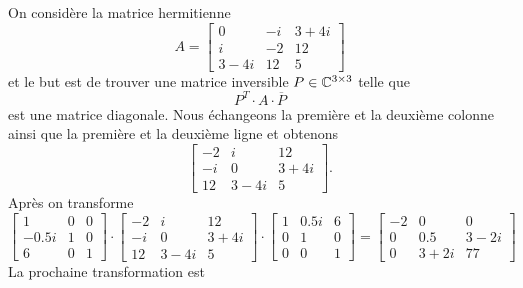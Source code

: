 \begin{example}
  \label{exe:16}
  On considère la matrice hermitienne 
  \begin{displaymath}
    A = \left[\begin{matrix}0 & - i & 3 + 4 i\\i & -2 & 12\\3 - 4 i & 12 & 5\end{matrix}\right]
  \end{displaymath}
et le but est de trouver une matrice inversible $P \in \mathbb{C}^{3 \times 3}$ telle que 
\begin{displaymath}
  P^T \cdot A \cdot \overline{P}
\end{displaymath}
est une matrice diagonale. Nous échangeons la première et la deuxième colonne ainsi que la première et la deuxième ligne et obtenons 
\begin{displaymath}
\left[\begin{matrix}-2 & i & 12\\- i & 0 & 3 + 4 i\\12 & 3 - 4 i & 5\end{matrix}\right]. 
\end{displaymath}
Après on transforme 
\begin{displaymath}
\left[\begin{matrix}1 & 0 & 0\\- 0.5 i & 1 & 0\\6 & 0 & 1\end{matrix}\right]\cdot  \left[\begin{matrix}-2 & i & 12\\- i & 0 & 3 + 4 i\\12 & 3 - 4 i & 5\end{matrix}\right]\cdot  
\left[\begin{matrix}1 & 0.5 i & 6\\0 & 1 & 0\\0 & 0 & 1\end{matrix}\right]
  = 
\left[\begin{matrix}-2 & 0 & 0\\0 & 0.5 & 3 - 2 i\\0 & 3 + 2 i & 77\end{matrix}\right]
\end{displaymath}
La prochaine transformation est 


\end{example}
